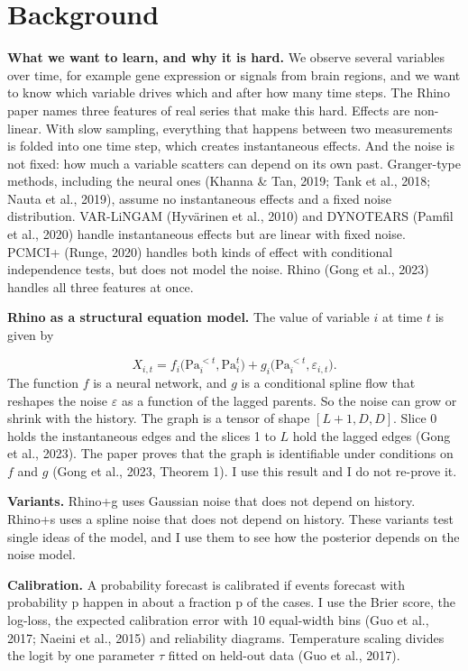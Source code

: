 \documentclass[10pt]{article}
\begin{document}
\section{Background}
\textbf{What we want to learn, and why it is hard.} We observe several variables over time, for example gene expression or signals from brain regions, and we want to know which variable drives which and after how many time steps. The Rhino paper names three features of real series that make this hard. Effects are non-linear. With slow sampling, everything that happens between two measurements is folded into one time step, which creates instantaneous effects. And the noise is not fixed: how much a variable scatters can depend on its own past. Granger-type methods, including the neural ones (Khanna \& Tan, 2019; Tank et al., 2018; Nauta et al., 2019), assume no instantaneous effects and a fixed noise distribution. VAR-LiNGAM (Hyvärinen et al., 2010) and DYNOTEARS (Pamfil et al., 2020) handle instantaneous effects but are linear with fixed noise. PCMCI+ (Runge, 2020) handles both kinds of effect with conditional independence tests, but does not model the noise. Rhino (Gong et al., 2023) handles all three features at once.

\textbf{Rhino as a structural equation model.} The value of variable $i$ at time $t$ is given by

\begin{equation}X_{i,t}=f_i\big(\mathrm{Pa}_i^{<t},\mathrm{Pa}_i^{t}\big)+g_i\big(\mathrm{Pa}_i^{<t},\varepsilon_{i,t}\big).\end{equation}
The function $f$ is a neural network, and $g$ is a conditional spline flow that reshapes the noise $\varepsilon$ as a function of the lagged parents. So the noise can grow or shrink with the history. The graph is a tensor of shape $[L+1,D,D]$. Slice 0 holds the instantaneous edges and the slices 1 to $L$ hold the lagged edges (Gong et al., 2023). The paper proves that the graph is identifiable under conditions on $f$ and $g$ (Gong et al., 2023, Theorem 1). I use this result and I do not re-prove it.

\textbf{Variants.} Rhino+g uses Gaussian noise that does not depend on history. Rhino+s uses a spline noise that does not depend on history. These variants test single ideas of the model, and I use them to see how the posterior depends on the noise model.

\textbf{Calibration.} A probability forecast is calibrated if events forecast with probability p happen in about a fraction p of the cases. I use the Brier score, the log-loss, the expected calibration error with 10 equal-width bins (Guo et al., 2017; Naeini et al., 2015) and reliability diagrams. Temperature scaling divides the logit by one parameter $\tau$ fitted on held-out data (Guo et al., 2017).
\end{document}
